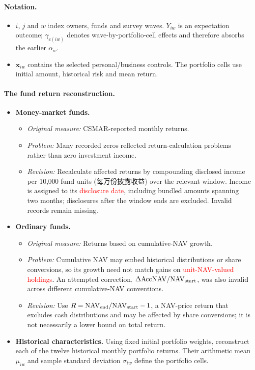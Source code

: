 \documentclass[11pt,letterpaper,english,final]{article}
\begin{document}
\paragraph{Notation.}
\begin{itemize}
\item $i$, $j$ and $w$ index owners, funds and survey waves. $Y_{iw}$ is an expectation outcome; $\gamma_{c(iw)}$ denotes wave-by-portfolio-cell effects and therefore absorbs the earlier $\alpha_w$.
\item $\bm{x}_{iw}$ contains the selected personal/business controls. The portfolio cells use initial amount, historical risk and mean return.
\end{itemize}

\paragraph{The fund return reconstruction.}
\begin{itemize}
\item \textbf{Money-market funds.}
\begin{itemize}
  \item \textit{Original measure:} CSMAR-reported monthly returns.
  \item \textit{Problem:} Many recorded zeros reflected return-calculation problems rather than zero investment income.
  \item \textit{Revision:} Recalculate affected returns by compounding disclosed income per 10,000 fund units (每万份披露收益) over the relevant window. Income is assigned to its \textcolor{red}{disclosure date}, including bundled amounts spanning two months; disclosures after the window ends are excluded. Invalid records remain missing.
\end{itemize}

\item \textbf{Ordinary funds.}
\begin{itemize}
  \item \textit{Original measure:} Returns based on cumulative-NAV growth.
  \item \textit{Problem:} Cumulative NAV may embed historical distributions or share conversions, so its growth need not match gains on \textcolor{red}{unit-NAV-valued holdings}. An attempted correction, $\Delta\mathrm{AccNAV}/\mathrm{NAV}_{\rm start}$, was also invalid across different cumulative-NAV conventions.
  \item \textit{Revision:} Use $R=\mathrm{NAV}_{\rm end}/\mathrm{NAV}_{\rm start}-1$, a NAV-price return that excludes cash distributions and may be affected by share conversions; it is not necessarily a lower bound on total return.
\end{itemize}

\item \textbf{Historical characteristics.} Using fixed initial portfolio weights, reconstruct each of the twelve historical monthly portfolio returns. Their arithmetic mean $\mu_{iw}$ and sample standard deviation $\sigma_{iw}$ define the portfolio cells.
\end{itemize}
\end{document}
